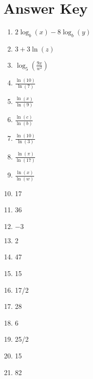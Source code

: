 \newpage

\section{Answer Key}

\begin{enumerate}
	\item $2\log_b(x) - 8\log_b(y)$
    \item $3 + 3\ln(z)$
    \item $\log_5\left(\frac{9x}{w^2}\right)$
    \item $\frac{\ln(10)}{\ln(7)}$
    \item $\frac{\ln(x)}{\ln(9)}$
    \item $\frac{\ln(c)}{\ln(b)}$
    \item $\frac{\ln(10)}{\ln(3)}$
    \item $\frac{\ln(\pi)}{\ln(17)}$
    \item $\frac{\ln(x)}{\ln(w)}$
    \item 17
    \item 36
    \item $-3$
    \item 2
    \item 47
    \item 15
    \item 17/2
    \item 28
    \item 6
    \item 25/2
    \item 15
    \item 82
\end{enumerate}